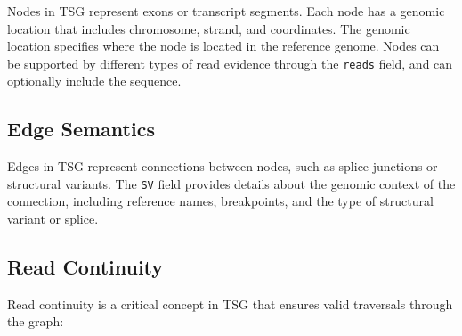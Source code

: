 \documentclass{article}
\begin{document}
Nodes in TSG represent exons or transcript segments.
Each node has a genomic location that includes chromosome, strand, and coordinates.
The genomic location specifies where the node is located in the reference genome.
Nodes can be supported by different types of read evidence through the \texttt{reads} field, and can optionally include the sequence.

\subsection{Edge Semantics}

Edges in TSG represent connections between nodes, such as splice junctions or structural variants.
The \texttt{SV} field provides details about the genomic context of the connection, including reference names, breakpoints, and the type of structural variant or splice.

\subsection{Read Continuity}

Read continuity is a critical concept in TSG that ensures valid traversals through the graph:
\end{document}
